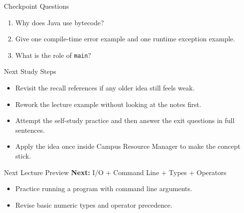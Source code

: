 \documentclass{beamer}
\begin{document}
\begin{frame}{Checkpoint Questions}
  \begin{enumerate}[<+->]
    \item Why does Java use bytecode?
    \item Give one compile-time error example and one runtime exception example.
    \item What is the role of \texttt{main}?
  \end{enumerate}
  \slidesources{\OOPSUnitISources}
\end{frame}

\begin{frame}{Next Study Steps}
\begin{itemize}[<+->]
  \item Revisit the recall references if any older idea still feels weak.
  \item Rework the lecture example without looking at the notes first.
  \item Attempt the self-study practice and then answer the exit questions in full sentences.
  \item Apply the idea once inside Campus Resource Manager to make the concept stick.
\end{itemize}
  \slidesources{\OOPSUnitISources}
\end{frame}

\begin{frame}{Next Lecture Preview}
  \textbf{Next:} I/O + Command Line + Types + Operators
  \vspace{0.6em}
  \begin{itemize}[<+->]
    \item Practice running a program with command line arguments.
    \item Revise basic numeric types and operator precedence.
  \end{itemize}
  \slidesources{\OOPSUnitISources}
\end{frame}
\end{document}
